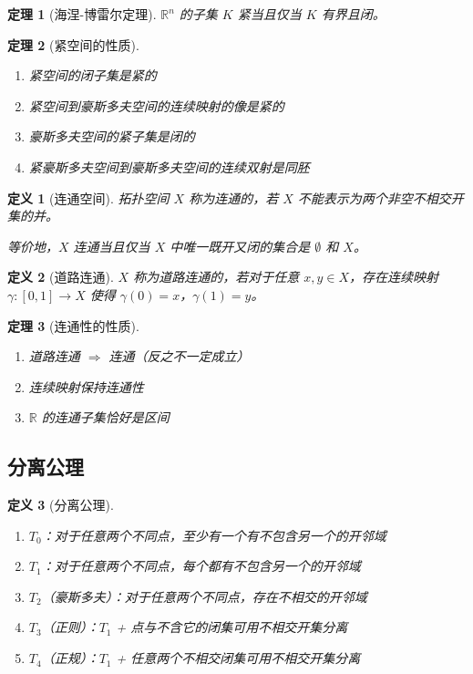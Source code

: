 \documentclass[12pt]{article}
\newtheorem{theorem}{定理}[section]
\newtheorem{definition}{定义}[section]
\begin{document}
\begin{theorem}[海涅-博雷尔定理]
$\mathbb{R}^n$ 的子集 $K$ 紧当且仅当 $K$ 有界且闭。
\end{theorem}

\begin{theorem}[紧空间的性质]
\begin{enumerate}
\item 紧空间的闭子集是紧的
\item 紧空间到豪斯多夫空间的连续映射的像是紧的
\item 豪斯多夫空间的紧子集是闭的
\item 紧豪斯多夫空间到豪斯多夫空间的连续双射是同胚
\end{enumerate}
\end{theorem}

\begin{definition}[连通空间]
拓扑空间 $X$ 称为连通的，若 $X$ 不能表示为两个非空不相交开集的并。

等价地，$X$ 连通当且仅当 $X$ 中唯一既开又闭的集合是 $\emptyset$ 和 $X$。
\end{definition}

\begin{definition}[道路连通]
$X$ 称为道路连通的，若对于任意 $x, y \in X$，存在连续映射 $\gamma: [0, 1] \to X$ 使得 $\gamma(0) = x$，$\gamma(1) = y$。
\end{definition}

\begin{theorem}[连通性的性质]
\begin{enumerate}
\item 道路连通 $\Rightarrow$ 连通（反之不一定成立）
\item 连续映射保持连通性
\item $\mathbb{R}$ 的连通子集恰好是区间
\end{enumerate}
\end{theorem}

\subsection{分离公理}

\begin{definition}[分离公理]
\begin{enumerate}
\item $T_0$：对于任意两个不同点，至少有一个有不包含另一个的开邻域
\item $T_1$：对于任意两个不同点，每个都有不包含另一个的开邻域
\item $T_2$（豪斯多夫）：对于任意两个不同点，存在不相交的开邻域
\item $T_3$（正则）：$T_1$ + 点与不含它的闭集可用不相交开集分离
\item $T_4$（正规）：$T_1$ + 任意两个不相交闭集可用不相交开集分离
\end{enumerate}
\end{definition}
\end{document}
